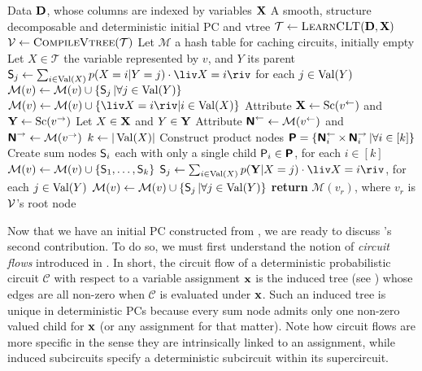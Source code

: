 \begin{algorithm}[t]
  \caption{}\label{alg:strudelinit}
  \begin{algorithmic}[1]
    \Require Data $\mathbf{D}$, whose columns are indexed by variables $\mathbf{X}$
    \Ensure A smooth, structure decomposable and deterministic initial PC and vtree
    \State $\mathcal{T}\gets\textproc{LearnCLT}(\set{D},\set{X})$
    \State $\vtree\gets\textproc{CompileVtree}(\mathcal{T})$
    \State Let $\mathcal{M}$ a hash table for caching circuits, initially empty
        \State Let $X\in\mathcal{T}$ the variable represented by $v$, and $Y$ its parent
          \State $\Sum_j\gets\sum_{i\in\Val(X)}p(X=i|Y=j)\cdot\liv X=i\riv$ for each $j\in\operatorname*{\normalfont{Val}}(Y)$
          \State $\mathcal{M}(v)\gets\mathcal{M}(v)\cup\{\operatorname{\textsf{S}}_j|\forall j\in\operatorname*{\normalfont{Val}}(Y)\}$
        \Else
          \State $\mathcal{M}(v)\gets\mathcal{M}(v)\cup\{\liv X=i\riv|i\in\Val(X)\}$
        \EndIf
      \Else
        \State Attribute $\mathbf{X}\gets\operatorname*{\normalfont{Sc}}(v^\gets)$ and $\mathbf{Y}\gets\operatorname*{\normalfont{Sc}}(v^\to)$
        \State Let $X\in\mathbf{X}$ and $Y\in\mathbf{Y}$
        \State Attribute $\operatorname{\textsf{\textbf{N}}}^\gets\gets\mathcal{M}(v^\gets)$ and $\operatorname{\textsf{\textbf{N}}}^\to\gets\mathcal{M}(v^\to)$
        \State $k\gets|\operatorname*{\normalfont{Val}}(X)|$
        \State Construct product nodes $\operatorname{\textsf{\textbf{P}}}=\{\operatorname{\textsf{\textbf{N}}}_i^\gets\times\operatorname{\textsf{\textbf{N}}}_i^\to|\forall i\in\left[k\right]\}$
          \State Create sum nodes $\operatorname{\textsf{S}}_i$ each with only a single child $\operatorname{\textsf{P}}_i\in\operatorname{\textsf{\textbf{P}}}$, for each $i\in\left[k\right]$
          \State $\mathcal{M}(v)\gets\mathcal{M}(v)\cup\{\operatorname{\textsf{S}}_1,\ldots,\operatorname{\textsf{S}}_k\}$
        \Else
          \State $\Sum_j\gets\sum_{i\in\Val(X)}p(\set{Y}|X=j)\cdot\liv X=i\riv$, for each $j\in\operatorname*{\normalfont{Val}}(Y)$
          \State $\mathcal{M}(v)\gets\mathcal{M}(v)\cup\{\operatorname{\textsf{S}}_j|\forall j\in\operatorname*{\normalfont{Val}}(Y)\}$
        \EndIf
      \EndIf
    \EndFor
    \State \textbf{return} $\mathcal{M}(v_r)$, where $v_r$ is $\operatorname{\mathcal{V}}$'s root node
  \end{algorithmic}
\end{algorithm}

Now that we have an initial PC constructed from , we are ready to discuss
's second contribution. To do so, we must first understand the notion of
\emph{circuit flows} introduced in \citet{dang20}. In short, the circuit flow of a deterministic
probabilistic circuit $\mathcal{C}$ with respect to a variable assignment $\mathbf{x}$ is the induced
tree (see ) whose edges are all non-zero when $\mathcal{C}$ is evaluated under
$\mathbf{x}$. Such an induced tree is unique in deterministic PCs because every sum node admits only
one non-zero valued child for $\mathbf{x}$ (or any assignment for that matter). Note how circuit flows
are more specific in the sense they are intrinsically linked to an assignment, while induced
subcircuits specify a deterministic subcircuit within its supercircuit.

